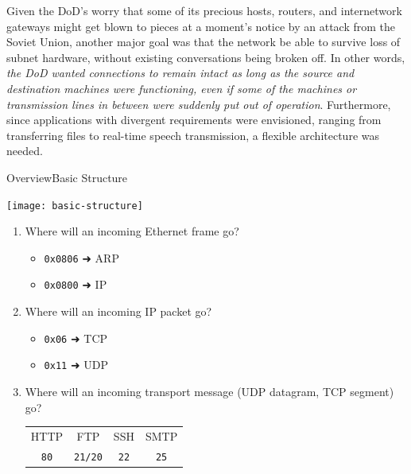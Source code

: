  Given the DoD's worry that some of its precious hosts, routers, and internetwork
  gateways might get blown to pieces at a moment's notice by an attack from the Soviet
  Union, another major goal was that the network be able to survive loss of subnet
  hardware, without existing conversations being broken off. In other words, \emph{the DoD
    wanted connections to remain intact as long as the source and destination machines
    were functioning, even if some of the machines or transmission lines in between were
    suddenly put out of operation}. Furthermore, since applications with divergent
  requirements were envisioned, ranging from transferring files to real-time speech
  transmission, a flexible architecture was needed.


\begin{frame}{{\tcpip} Overview}{Basic Structure}
  \begin{minipage}{.4\linewidth}
    \texttt{[image: basic-structure]}\label{fig:basic-node}
  \end{minipage}\hfill
  \begin{minipage}{.6\linewidth}
    \begin{enumerate}
    \item Where will an incoming Ethernet frame go?
      \begin{itemize}
      \item[] \texttt{0x0806} {\dejavu ➜} ARP
      \item[] \texttt{0x0800} {\dejavu ➜} IP
      \end{itemize}
    \item Where will an incoming IP packet go?
      \begin{itemize}
      \item[] \texttt{0x06} {\dejavu ➜} TCP
      \item[] \texttt{0x11} {\dejavu ➜} UDP
      \end{itemize}
    \item Where will an incoming transport message (UDP datagram, TCP segment) go?
      \begin{center}{\small
        \begin{tabular}{cccc}\hline
          HTTP&FTP&SSH&SMTP\\
          \texttt{80}&\texttt{21/20}&\texttt{22}&\texttt{25}\\\hline
        \end{tabular}}
      \end{center}
    \end{enumerate}
  \end{minipage}
\end{frame}

